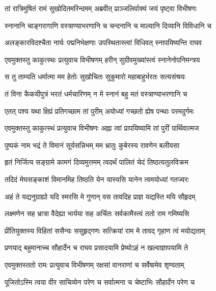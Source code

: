 
\twolineshloka
{तां रात्रिमुषितं रामं सुखोदितमरिन्दमम्}
{अब्रवीत् प्राञ्जलिर्वाक्यं जयं पृष्ट्वा विभीषणः} %

\twolineshloka
{स्नानानि चाङ्गरागाणि वस्त्राण्याभरणानि च}
{चन्दनानि च माल्यानि दिव्यानि विविधानि च} %

\twolineshloka
{अलङ्कारविदश्चैता नार्यः पद्मनिभेक्षणाः}
{उपस्थितास्त्वां विधिवत् स्नापयिष्यन्ति राघव} %

\twolineshloka
{एवमुक्तस्तु काकुत्स्थः प्रत्युवाच विभीषणम्}
{हरीन् सुग्रीवमुख्यांस्त्वं स्नानेनोपनिमन्त्रय} %

\twolineshloka
{स तु ताम्यति धर्मात्मा मम हेतोः सुखोचितः}
{सुकुमारो महाबाहुर्भरतः सत्यसंश्रयः} %

\twolineshloka
{तं विना कैकयीपुत्रं भरतं धर्मचारिणम्}
{न मे स्नानं बहु मतं वस्त्राण्याभरणानि च} %

\twolineshloka
{एतत् पश्य यथा क्षिप्रं प्रतिगच्छाम तां पुरीम्}
{अयोध्यां गच्छतो ह्येष पन्थाः परमदुर्गमः} %

\twolineshloka
{एवमुक्तस्तु काकुत्स्थं प्रत्युवाच विभीषणः}
{अह्ना त्वां प्रापयिष्यामि तां पुरीं पार्थिवात्मज} %

\twolineshloka
{पुष्पकं नाम भद्रं ते विमानं सूर्यसन्निभम्}
{मम भ्रातुः कुबेरस्य रावणेन बलीयसा} %

\twolineshloka
{हृतं निर्जित्य सङ्ग्रामे कामगं दिव्यमुत्तमम्}
{त्वदर्थं पालितं चेदं तिष्ठत्यतुलविक्रम} %

\twolineshloka
{तदिदं मेघसङ्काशं विमानमिह तिष्ठति}
{येन यास्यसि यानेन त्वमयोध्यां गतज्वरः} %

\twolineshloka
{अहं ते यद्यनुग्राह्यो यदि स्मरसि मे गुणान्}
{वस तावदिह प्राज्ञ यद्यस्ति मयि सौहृदम्} %

\twolineshloka
{लक्ष्मणेन सह भ्रात्रा वैदेह्या भार्यया सह}
{अर्चितः सर्वकामैस्त्वं ततो राम गमिष्यसि} %

\twolineshloka
{प्रीतियुक्तस्य विहितां ससैन्यः ससुहृद्गणः}
{सत्क्रियां राम मे तावद् गृहाण त्वं मयोद्यताम्} %

\twolineshloka
{प्रणयाद् बहुमानाच्च सौहार्देन च राघव}
{प्रसादयामि प्रेष्योऽहं न खल्वाज्ञापयामि ते} %

\twolineshloka
{एवमुक्तस्ततो रामः प्रत्युवाच विभीषणम्}
{रक्षसां वानराणां च सर्वेषामेव शृण्वताम्} %

\twolineshloka
{पूजितोऽस्मि त्वया वीर साचिव्येन परेण च}
{सर्वात्मना च चेष्टाभिः सौहार्देन परेण च} %

